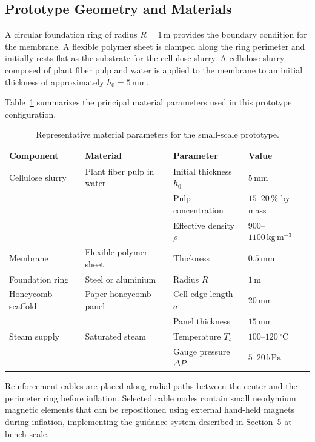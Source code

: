 \documentclass[12pt,a4paper]{article}
\begin{document}
\subsection{Prototype Geometry and Materials}

A circular foundation ring of radius $R = 1\,\mathrm{m}$ provides the
boundary condition for the membrane. A flexible polymer sheet is
clamped along the ring perimeter and initially rests flat as the
substrate for the cellulose slurry. A cellulose slurry composed of
plant fiber pulp and water is applied to the membrane to an initial
thickness of approximately $h_0 = 5\,\mathrm{mm}$.

Table~\ref{tab:materials} summarizes the principal material parameters
used in this prototype configuration.

\begin{table}[ht]
\centering
\caption{Representative material parameters for the small-scale prototype.}
\label{tab:materials}
\begin{tabular}{llll}
\toprule
Component & Material & Parameter & Value \\
\midrule
Cellulose slurry & Plant fiber pulp in water & Initial thickness $h_0$ & $5\,\mathrm{mm}$ \\
                 &                           & Pulp concentration & $15$--$20\,\%$ by mass \\
                 &                           & Effective density $\rho$ & $900$--$1100\,\mathrm{kg\,m^{-3}}$ \\
Membrane         & Flexible polymer sheet    & Thickness & $0.5\,\mathrm{mm}$ \\
Foundation ring  & Steel or aluminium        & Radius $R$ & $1\,\mathrm{m}$ \\
Honeycomb scaffold & Paper honeycomb panel   & Cell edge length $a$ & $20\,\mathrm{mm}$ \\
                   &                         & Panel thickness & $15\,\mathrm{mm}$ \\
Steam supply     & Saturated steam           & Temperature $T_s$ & $100$--$120\,^\circ\mathrm{C}$ \\
                 &                           & Gauge pressure $\Delta P$ & $5$--$20\,\mathrm{kPa}$ \\
\bottomrule
\end{tabular}
\end{table}

Reinforcement cables are placed along radial paths between the center
and the perimeter ring before inflation. Selected cable nodes contain
small neodymium magnetic elements that can be repositioned using
external hand-held magnets during inflation, implementing the guidance
system described in Section~5 at bench scale.
\end{document}
